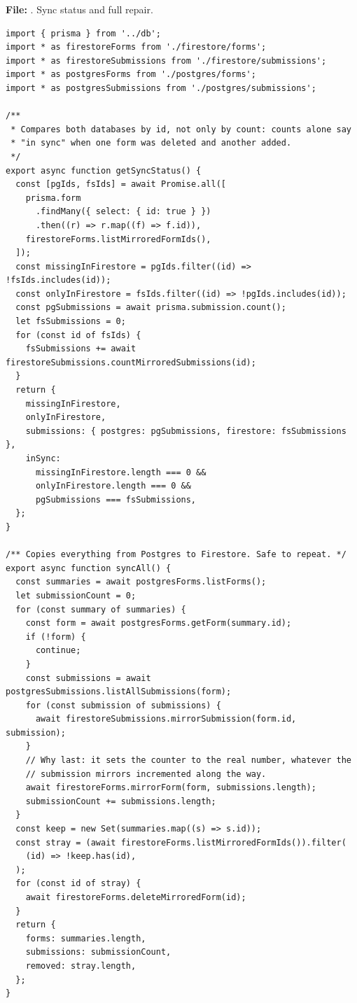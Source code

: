 \documentclass[11pt,a4paper]{article}
\begin{document}
\textbf{File:} . Sync status and full repair.\par
\begin{lstlisting}
import { prisma } from '../db';
import * as firestoreForms from './firestore/forms';
import * as firestoreSubmissions from './firestore/submissions';
import * as postgresForms from './postgres/forms';
import * as postgresSubmissions from './postgres/submissions';

/**
 * Compares both databases by id, not only by count: counts alone say
 * "in sync" when one form was deleted and another added.
 */
export async function getSyncStatus() {
  const [pgIds, fsIds] = await Promise.all([
    prisma.form
      .findMany({ select: { id: true } })
      .then((r) => r.map((f) => f.id)),
    firestoreForms.listMirroredFormIds(),
  ]);
  const missingInFirestore = pgIds.filter((id) => !fsIds.includes(id));
  const onlyInFirestore = fsIds.filter((id) => !pgIds.includes(id));
  const pgSubmissions = await prisma.submission.count();
  let fsSubmissions = 0;
  for (const id of fsIds) {
    fsSubmissions += await firestoreSubmissions.countMirroredSubmissions(id);
  }
  return {
    missingInFirestore,
    onlyInFirestore,
    submissions: { postgres: pgSubmissions, firestore: fsSubmissions },
    inSync:
      missingInFirestore.length === 0 &&
      onlyInFirestore.length === 0 &&
      pgSubmissions === fsSubmissions,
  };
}

/** Copies everything from Postgres to Firestore. Safe to repeat. */
export async function syncAll() {
  const summaries = await postgresForms.listForms();
  let submissionCount = 0;
  for (const summary of summaries) {
    const form = await postgresForms.getForm(summary.id);
    if (!form) {
      continue;
    }
    const submissions = await postgresSubmissions.listAllSubmissions(form);
    for (const submission of submissions) {
      await firestoreSubmissions.mirrorSubmission(form.id, submission);
    }
    // Why last: it sets the counter to the real number, whatever the
    // submission mirrors incremented along the way.
    await firestoreForms.mirrorForm(form, submissions.length);
    submissionCount += submissions.length;
  }
  const keep = new Set(summaries.map((s) => s.id));
  const stray = (await firestoreForms.listMirroredFormIds()).filter(
    (id) => !keep.has(id),
  );
  for (const id of stray) {
    await firestoreForms.deleteMirroredForm(id);
  }
  return {
    forms: summaries.length,
    submissions: submissionCount,
    removed: stray.length,
  };
}
\end{lstlisting}
\end{document}
